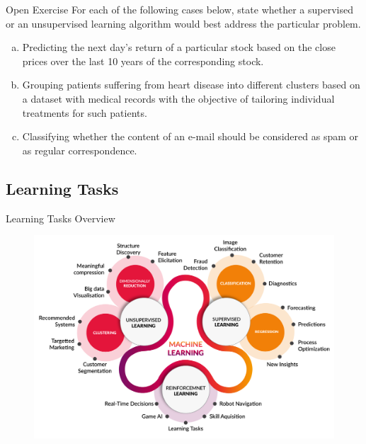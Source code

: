 \documentclass[document.tex]{subfiles}
\begin{document}
    \begin{frame}{Open Exercise }
        For each of the following cases below, state whether a supervised or an unsupervised learning algorithm would best address the particular problem.
        \begin{enumerate}[a)]
            \item Predicting the next day's return of a particular stock based on the close prices over the last 10 years of the corresponding stock.
            \item Grouping patients suffering from heart disease into different clusters based on a dataset with medical records with the objective of tailoring individual treatments for such patients.
            \item Classifying whether the content of an e-mail should be considered as spam or as regular correspondence.
        \end{enumerate}
    \end{frame}

    \subsection{Learning Tasks}
    
    \begin{frame}{Learning Tasks Overview}
        \begin{figure}
            \label{fig:learning-tasks}
            \includegraphics[width=.7\textwidth]{figures/external/learning-styles.png}
        \end{figure}
    \end{frame}
\end{document}
